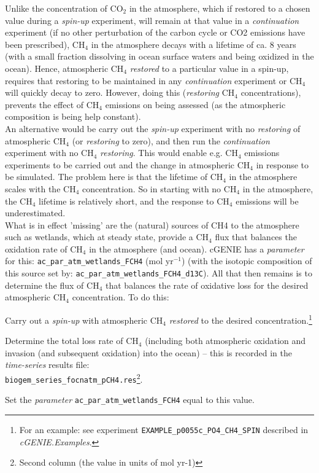 \documentclass[10pt,twoside]{article}
\begin{document}
Unlike the concentration of CO\(_{2}\) in the atmosphere, which if restored to a chosen value during a \textit{spin-up} experiment, will remain at that value in a \textit{continuation} experiment (if no other perturbation of the carbon cycle or CO2 emissions have been prescribed), CH\(_{4}\) in the atmosphere decays with a lifetime of ca. 8 years (with a small fraction dissolving in ocean surface waters and being oxidized in the ocean). Hence, atmospheric CH\(_{4}\) \textit{restored} to a particular value in a spin-up, requires that restoring to be maintained in any \textit{continuation} experiment or CH\(_{4}\) will quickly decay to zero. However, doing this (\textit{restoring} CH\(_{4}\) concentrations), prevents the effect of CH\(_{4}\) emissions on being assessed (as the atmospheric composition is being help constant).\\
An alternative would be carry out the \textit{spin-up} experiment with no \textit{restoring} of atmospheric CH\(_{4}\) (or \textit{restoring} to zero), and then run the \textit{continuation} experiment with no CH\(_{4}\) \textit{restoring}. This would enable e.g. CH\(_{4}\) emissions experiments to be carried out and the change in atmospheric CH\(_{4}\) in response to be simulated. The problem here is that the lifetime of  CH\(_{4}\) in the atmosphere scales with the CH\(_{4}\) concentration. So in starting with no CH\(_{4}\) in the atmosphere, the CH\(_{4}\) lifetime is relatively short, and the response to CH\(_{4}\) emissions will be underestimated.\\
What is in effect 'missing' are the (natural) sources of CH4 to the atmosphere such as wetlands, which at steady state, provide a CH\(_{4}\) flux that balances the oxidation rate of CH\(_{4}\) in the atmosphere (and ocean). cGENIE has a \textit{parameter} for this: \texttt{ac\_par\_atm\_wetlands\_FCH4} (mol yr\(^{-1}\)) (with the isotopic composition of this source set by: \texttt{ac\_par\_atm\_wetlands\_FCH4\_d13C}). All that then remains is to determine the flux of CH\(_{4}\) that balances the rate of oxidative loss for the desired atmospheric CH\(_{4}\) concentration. To do this:
\begin{compactenum}
        \item Carry out a \textit{spin-up} with atmospheric CH\(_{4}\) \textit{restored} to the desired concentration.\footnote{For an example: see experiment \texttt{EXAMPLE\_p0055c\_PO4\_CH4\_SPIN} described in \textit{cGENIE.Examples}.}
        \item Determine the total loss rate of CH\(_{4}\) (including both atmospheric oxidation and invasion (and subsequent oxidation) into the ocean) -- this is recorded in the \textit{time-series} results file:\\ \texttt{biogem\_series\_focnatm\_pCH4.res}\footnote{Second column (the value in units of mol yr-1)}.
        \item Set the \textit{parameter} \texttt{ac\_par\_atm\_wetlands\_FCH4} equal to this value.\end{compactenum} 
\end{document}
